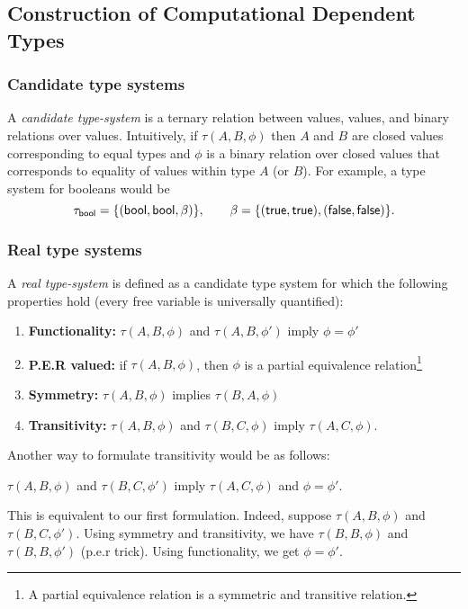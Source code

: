 \documentclass{article} \usepackage{chtt-notes} \usepackage{stmaryrd}
\begin{document}
\subsection{Construction of Computational Dependent Types}

\subsubsection{Candidate type systems}

A \emph{candidate type-system} is a ternary relation between values,
values, and binary relations over values.  Intuitively, if
$\tau(A, B, \phi)$ then $A$ and $B$ are closed values corresponding to
equal types and $\phi$ is a binary relation over closed values that
corresponds to equality of values within type $A$ (or $B$).  For
example, a type system for booleans would be
\[\tau_{\mathsf{bool}} = \{(\mathsf{bool}, \mathsf{bool}, \beta)\}, \qquad
  \beta = \{(\mathsf{true}, \mathsf{true}), (\mathsf{false}, \mathsf{false})\}.\]

\subsubsection{Real type systems}
A \emph{real type-system} is defined as a candidate type system for
which the following properties hold (every free variable is
universally quantified):
\begin{enumerate}
\item \textbf{Functionality:} $\tau(A, B, \phi)$ and
  $\tau(A, B, \phi')$ imply $\phi = \phi'$
\item \textbf{\textsc{P.E.R} valued:} if $\tau(A, B, \phi)$, then
  $\phi$ is a partial equivalence relation\footnote{A partial
    equivalence relation is a symmetric and transitive relation.}
\item \textbf{Symmetry:} $\tau(A, B, \phi)$ implies $\tau(B, A, \phi)$
\item \textbf{Transitivity:} $\tau(A, B, \phi)$ and $\tau(B, C, \phi)$
  imply $\tau(A, C, \phi)$.
\end{enumerate}

\medskip

\begin{remark*}
  Another way to formulate transitivity would be as follows:
  \begin{center}
    $\tau(A, B, \phi)$ and $\tau(B, C, \phi')$ imply
    $\tau(A, C, \phi)$ and $\phi = \phi'$.
  \end{center}
  This is equivalent to our first formulation.  Indeed, suppose
  $\tau(A, B, \phi)$ and $\tau(B, C, \phi')$. Using symmetry and
  transitivity, we have $\tau(B, B, \phi)$ and $\tau(B, B, \phi')$
  (p.e.r trick).  Using functionality, we get $\phi = \phi'$.
\end{remark*}
\end{document}
